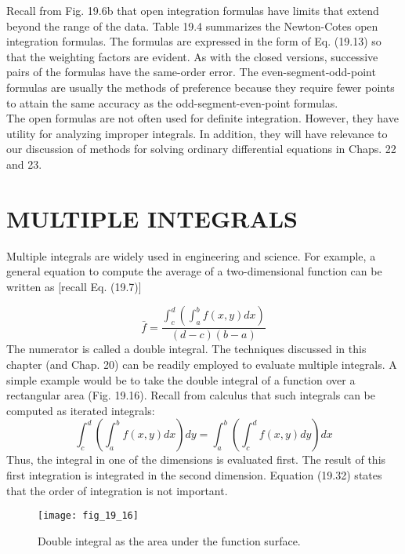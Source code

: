 \documentclass[../main.tex]{subfiles}
\begin{document}
Recall from Fig. 19.6b that open integration formulas have limits that extend beyond the
range of the data. Table 19.4 summarizes the Newton-Cotes open integration formulas. The
formulas are expressed in the form of Eq. (19.13) so that the weighting factors are evident.
As with the closed versions, successive pairs of the formulas have the same-order error.
The even-segment-odd-point formulas are usually the methods of preference because they
require fewer points to attain the same accuracy as the odd-segment-even-point formulas.\\
The open formulas are not often used for definite integration. However, they have utility for analyzing improper integrals. In addition, they will have relevance to our discussion
of methods for solving ordinary differential equations in Chaps. 22 and 23.
\vspace{1cm}
\section{MULTIPLE INTEGRALS}
Multiple integrals are widely used in engineering and science. For example, a general
equation to compute the average of a two-dimensional function can be written as [recall
Eq. (19.7)]

\begin{equation}
    \tag{19.31}
\bar{f}=\frac{\int_{c}^{d}\left(\int_{a}^{b} f(x, y) d x\right)}{(d-c)(b-a)}
\end{equation}
The numerator is called a double integral.
The techniques discussed in this chapter (and Chap. 20) can be readily employed to evaluate multiple integrals. A simple example would be to take the double integral of a function over a rectangular area (Fig. 19.16).
Recall from calculus that such integrals can be computed as iterated integrals:
\begin{equation}
    \tag{19.32}
\int_{c}^{d}\left(\int_{a}^{b} f(x, y) d x\right) d y=\int_{a}^{b}\left(\int_{c}^{d} f(x, y) d y\right) d x
\end{equation}
Thus, the integral in one of the dimensions is evaluated first. The result of this first integration is integrated in the second dimension. Equation (19.32) states that the order of integration is not important.

\begin{figure}[H]
    \centering
    \texttt{[image: fig\_19\_16]}
   \caption{\textsf{Double integral as the area under the function surface.}}\label{fig:fig_19_16}
\end{figure}
\end{document}
